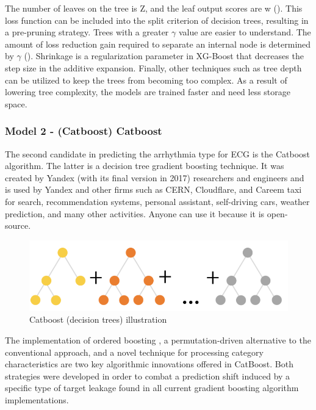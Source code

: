 The number of leaves on the tree is Z, and the leaf output scores are w (\cite{xgb2}). This loss function can be included into the split criterion of decision trees, resulting in a pre-pruning strategy. Trees with a greater $\gamma$ value are easier to understand. The amount of loss reduction gain required to separate an internal node is determined by $\gamma$ (\cite{xgb1}). Shrinkage is a regularization parameter in XG-Boost that decreases the step size in the additive expansion. Finally, other techniques such as tree depth can be utilized to keep the trees from becoming too complex. As a result of lowering tree complexity, the models are trained faster and need less storage space.

\subsubsection{Model 2 - (Catboost) Catboost} \label{3model2}

The second candidate in predicting the arrhythmia type for ECG is the Catboost algorithm. The latter is a decision tree gradient boosting technique. It was created by Yandex (with its final version in 2017) researchers and engineers and is used by Yandex and other firms such as CERN, Cloudflare, and Careem taxi for search, recommendation systems, personal assistant, self-driving cars, weather prediction, and many other activities. Anyone can use it because it is open-source.

\begin{figure}[H]
\centering
\includegraphics[scale=0.6]{img/catboost.PNG}
\caption{Catboost (decision trees) illustration}
\label{fig:catboost}
\end{figure}

The implementation of ordered boosting \cite{catboost}, a permutation-driven alternative to the conventional approach, and a novel technique for processing category characteristics are two key algorithmic innovations offered in CatBoost. Both strategies were developed in order to combat a prediction shift induced by a specific type of target leakage found in all current gradient boosting algorithm implementations.

